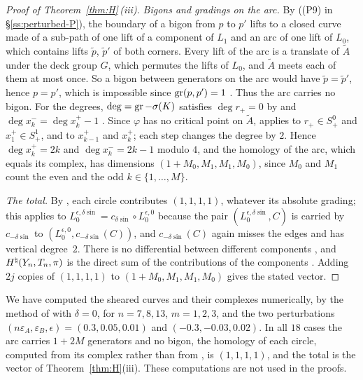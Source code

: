 \begin{proof}[Proof of Theorem~\ref{thm:H}\,(iii)]
\emph{Bigons and gradings on the arc.} By \cite[Lemma~6.4]{WuebbenV} ((P9) in \S\ref{ss:perturbed-P}), the boundary of a
bigon from $p$ to $p'$ lifts to a closed curve made of a sub-path of one lift of a component of $L_1$ and an arc of one
lift of $L_0$, which contains lifts $\tilde p$, $\tilde p'$ of both corners. Every lift of the arc is a translate of $\tilde A$
under the deck group $G$, which permutes the lifts of $L_0$, and $\tilde A$ meets each of them at most once. So a bigon
between generators on the arc would have $\tilde p=\tilde p'$, hence $p=p'$, which is impossible since $\operatorname{gr}(p,p')=1$
\cite[Prop.~3.8]{HHK2}. Thus the arc carries no bigon. For the degrees, $\deg=\operatorname{gr}-\sigma(K)$ satisfies $\deg r_+=0$
by \cite[(19)]{HHK2} and $\deg x_k^-=\deg x_k^+-1$ \cite[\S5.1]{HHK2}. Since $\varphi$ has no critical point on $\tilde A$,
\cite[Lemma~6.8]{WuebbenV} applies to $r_+\in S^0_+$ and $x_1^+\in S^1_+$, and to $x_{k-1}^+$ and $x_k^+$; each step
changes the degree by $2$. Hence $\deg x_k^+=2k$ and $\deg x_k^-=2k-1$ modulo $4$, and the homology of the arc,
which equals its complex, has dimensions $(1+M_0,M_1,M_1,M_0)$, since $M_0$ and $M_1$ count the even and the odd
$k\in\{1,\dots,M\}$.

\emph{The total.} By \cite[Thm.~5.4]{HHK2}, each circle contributes $(1,1,1,1)$, whatever its absolute grading; this
applies to $L_0^{\epsilon,\delta\sin}=c_{\delta\sin}\circ L_0^{\epsilon,0}$ because the pair $(L_0^{\epsilon,\delta\sin},C)$ is carried by
$c_{-\delta\sin}$ to $(L_0^{\epsilon,0},c_{-\delta\sin}(C))$, and $c_{-\delta\sin}(C)$ again misses the edges and has vertical degree~$2$.
There is no differential between different components \cite[p.~37]{HHK2}, and $H^{\natural}(Y_n,T_n,\pi)$ is the direct
sum of the contributions of the components \cite[p.~34]{HHK2}. Adding $2j$ copies of $(1,1,1,1)$ to
$(1+M_0,M_1,M_1,M_0)$ gives the stated vector.
\end{proof}

\begin{remark}\label{rem:twisted-numerics}
We have computed the sheared curves and their complexes numerically, by the method of
\cite[Rem.~6.12]{WuebbenV} with $\delta=0$, for $n=7,8,13$, $m=1,2,3$, and the two perturbations
$(n\varepsilon_A,\varepsilon_B,\epsilon)=(0.3,0.05,0.01)$ and $(-0.3,-0.03,0.02)$. In all $18$ cases the arc carries $1+2M$
generators and no bigon, the homology of each circle, computed from its complex rather than from
\cite[Thm.~5.4]{HHK2}, is $(1,1,1,1)$, and the total is the vector of Theorem~\ref{thm:H}(iii). These
computations are not used in the proofs.
\end{remark}

